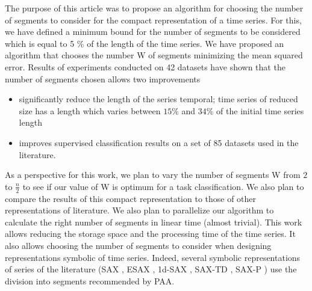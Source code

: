 The purpose of this article was to propose an algorithm for choosing the number of segments to consider for the compact representation of a time series. For this, we have defined a minimum bound for the number of segments to be considered which is equal to 5 \% of the length of the time series. We have proposed an algorithm that chooses the number W of segments minimizing the mean squared error. Results of experiments conducted on 42 datasets
 have shown that the number of segments chosen allows two improvements
 \begin{itemize}
\item significantly reduce the length of the series
temporal; time series of reduced size has a length
which varies between $ 15 \% $ and $ 34 \% $ of the initial time series length
\item improves supervised classification results on a set of 85 datasets
used in the literature. 
\end{itemize}
As a perspective for this work, we plan to vary the number of
segments W from $ 2 $ to $ \frac{n}{2} $ to see if our value of W is optimum for a task classification. We also plan to compare the results of this compact representation to
those of other representations of literature. We also plan to parallelize our algorithm to calculate the right number of segments in linear time (almost trivial). This work allows
reducing the storage space and the processing time of the time series. It also allows choosing the number of segments to consider when designing representations
symbolic of time series. Indeed, several symbolic representations of series
of the literature (SAX \cite{lin2003symbolic}, ESAX \cite{lkhagva2006extended}, 1d-SAX \cite{Malinowski2013},
SAX-TD \cite{sun2014improvement}, SAX-P \cite{siyou2015}) use the division into segments recommended by PAA.
\label{conclusion}





